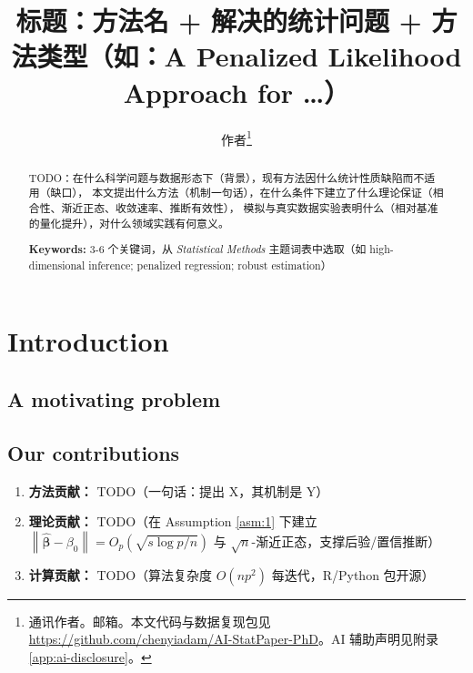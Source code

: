 \documentclass[11pt]{article}
\title{标题：方法名 + 解决的统计问题 + 方法类型（如：A Penalized Likelihood Approach for \ldots）}
\author{作者\thanks{通讯作者。邮箱。本文代码与数据复现包见 \url{https://github.com/chenyiadam/AI-StatPaper-PhD}。AI 辅助声明见附录 \ref{app:ai-disclosure}。}}
\date{}
\newcommand{\betaHat}{\hat{\bm{\beta}}}
\newcommand{\norm}[1]{\left\lVert #1 \right\rVert}
\begin{document}
\maketitle

\begin{abstract}
TODO：在什么科学问题与数据形态下（背景），现有方法因什么统计性质缺陷而不适用（缺口），
本文提出什么方法（机制一句话），在什么条件下建立了什么理论保证（相合性、渐近正态、收敛速率、推断有效性），
模拟与真实数据实验表明什么（相对基准的量化提升），对什么领域实践有何意义。
\bigskip

\noindent\textbf{Keywords:} 3-6 个关键词，从 \textit{Statistical Methods} 主题词表中选取（如 high-dimensional inference; penalized regression; robust estimation）
\end{abstract}

\newpage
\tableofcontents

\section{Introduction}\label{sec:intro}
\subsection{A motivating problem}\label{sec:motivate}

\subsection{Our contributions}\label{sec:contrib}
\begin{enumerate}[label=(\roman*)]
  \item \textbf{方法贡献：} TODO（一句话：提出 X，其机制是 Y）
  \item \textbf{理论贡献：} TODO（在 Assumption \ref{asm:1} 下建立
        $\norm{\betaHat-\beta_0}=O_p(\sqrt{s\log p/n})$ 与 $\sqrt{n}$-渐近正态，支撑后验/置信推断）
  \item \textbf{计算贡献：} TODO（算法复杂度 $O(n p^2)$ 每迭代，R/Python 包开源）
\end{enumerate}
\end{document}
